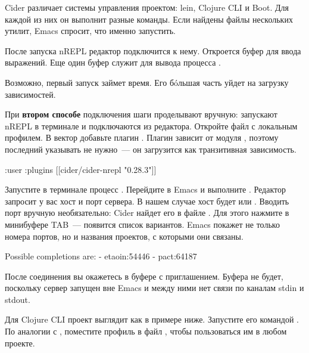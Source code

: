 Cider различает системы управления проектом: lein, Clojure CLI и Boot. Для каждой из них он выполнит разные команды. Если найдены файлы нескольких утилит, Emacs спросит, что именно запустить.

После запуска nREPL редактор подключится к нему. Откроется буфер  для ввода выражений. Еще один буфер  служит для вывода процесса .

Возможно, первый запуск  займет время. Его бóльшая часть уйдет на загрузку зависимостей.

При \textbf{втором способе} подключения шаги проделывают вручную: запускают nREPL в терминале и подключаются из редактора. Откройте файл  с локальным профилем. В вектор  \arr {} добавьте плагин . Плагин зависит от модуля , поэтому последний указывать не нужно~--- он загрузится как транзитивная зависимость.

\begin{english}
  \begin{clojure}
{:user
 {:plugins
  [[cider/cider-nrepl "0.28.3"]]}}
  \end{clojure}
\end{english}

Запустите в терминале процесс . Перейдите в Emacs и выполните . Редактор запросит у вас хост и порт сервера. В нашем случае хост будет  или . Вводить порт вручную необязательно: Cider найдет его в файле . Для этого нажмите в минибуфере TAB~--- появится список вариантов. Emacs покажет не только номера портов, но и названия проектов, с которыми они связаны.

\begin{english}
  \begin{text}
Possible completions are:
- etaoin:54446
- pact:64187
  \end{text}
\end{english}

После соединения вы окажетесь в буфере  с приглашением. Буфера  не будет, поскольку сервер запущен вне Emacs и между ними нет связи по каналам stdin и stdout.

Для Clojure CLI проект выглядит как в примере ниже. Запустите его командой . По аналогии с , поместите профиль  в файл , чтобы пользоваться им в любом проекте.


